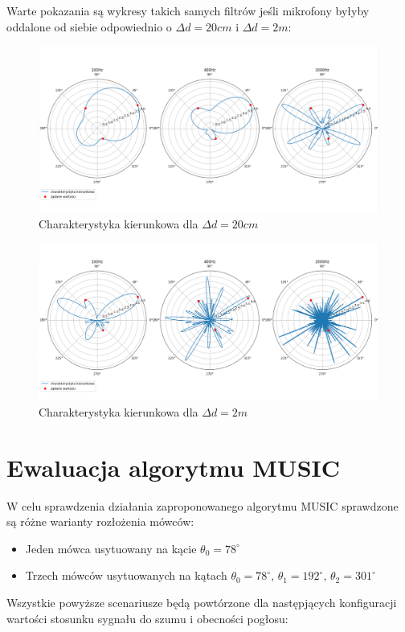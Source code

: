 \noindent Warte pokazania są wykresy takich samych filtrów jeśli mikrofony byłyby oddalone od siebie odpowiednio o $\Delta d = 20cm$ i $\Delta d = 2m$:

\begin{figure}[h!]
    \centering
    \includegraphics[width=\textwidth]{Images/directivity0.2m.png}
    \caption{Charakterystyka kierunkowa dla $\Delta d = 20cm$}
    \label{fig:directivity0.2}
\end{figure}

\begin{figure}[h!]
    \centering
    \includegraphics[width=\textwidth]{Images/directivity2m.png}
    \caption{Charakterystyka kierunkowa dla $\Delta d = 2m$}
    \label{fig:directivity2}
\end{figure}

\newpage

\section{Ewaluacja algorytmu MUSIC}

\noindent W celu sprawdzenia działania zaproponowanego algorytmu MUSIC sprawdzone są różne warianty rozłożenia mówców:

\begin{itemize}
    \item Jeden mówca usytuowany na kącie $\theta_{0} = 78^{\circ}$
    \item Trzech mówców usytuowanych na kątach $\theta_{0} = 78^{\circ}, \, \theta_{1} = 192^{\circ}, \, \theta_{2} = 301^{\circ}$
\end{itemize}
\noindent Wszystkie powyższe scenariusze będą powtórzone dla następjących konfiguracji wartości stosunku sygnału do szumu i obecności pogłosu:


